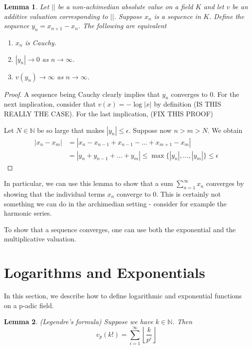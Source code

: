 \documentclass{article}
\newtheorem{lemma}{Lemma}[section]
\newcommand{\mbb}[1]{\mathbb{#1}}
\begin{document}
\begin{lemma} \label{lem:SufficientConditionForConvergence}
    Let $||$ be a non-achimedian absolute value on a field $K$ and let $v$ be an additive valuation corresponding to $||$. Suppose $x_n$ is a sequence in $K$. Define the sequence $y_n = x_{n+1} - x_{n}$. The following are equivalent
    \begin{enumerate}
        \item $x_n$ is Cauchy.
        \item $|y_n| \to 0$ as $n \to \infty$.
        \item $v(y_n) \to \infty$ as $n \to \infty$.
    \end{enumerate}
\end{lemma}
\begin{proof}
    A sequence being Cauchy clearly implies that $y_n$ converges to 0. For the next implication, consider that $v(x) = - \log |x|$ by definition (IS THIS REALLY THE CASE). For the last implication, (FIX THIS PROOF)
    
    Let $N \in \mbb N$ be so large that makes $|y_n| \leq \epsilon$. Suppose now $n > m > N$. We obtain
    \begin{align*}
        |x_n - x_m| &= |x_n - x_{n-1} + x_{n-1} - ... + x_{m+1} - x_{m}| \\ 
        &= |y_n + y_{n-1} + ... + y_{m}| \leq \max \{|y_n|, ..., |y_m|  \} \leq \epsilon
    \end{align*}
\end{proof}

In particular, we can use this lemma to show that a sum $\sum_{n=1}^\infty x_n$ converges by showing that the individual terms $x_n$ converge to 0. This is certainly not something we can do in the archimedian setting - consider for example the harmonic series. 


To show that a sequence converges, one can use both the exponential and the multiplicative valuation. 

\section{Logarithms and Exponentials}
In this section, we describe how to define logarithmic and exponential functions on a p-adic field. 


\begin{lemma}(Legendre's formula)
    Suppose we have $k \in \mbb N$. Then
    $$v_p(k!) = \sum_{i = 1}^{\infty} \left\lfloor \frac{k}{p^i} \right \rfloor$$
\end{lemma}
\end{document}

